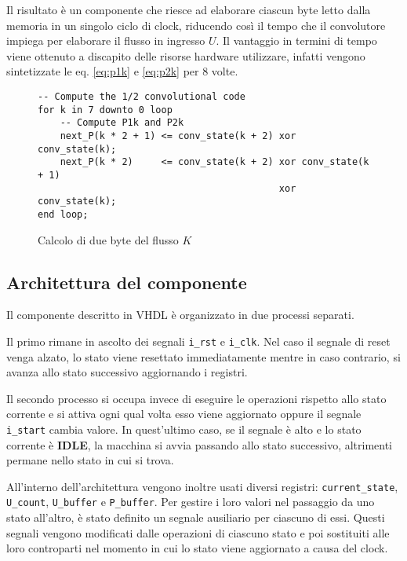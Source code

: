 Il risultato è un componente che riesce ad elaborare ciascun byte letto dalla memoria in un singolo ciclo di clock, riducendo così il tempo che il convolutore impiega per elaborare il flusso in ingresso $U$. Il vantaggio in termini di tempo viene ottenuto a discapito delle risorse hardware utilizzare, infatti vengono sintetizzate le eq. \ref{eq:p1k} e \ref{eq:p2k} per 8 volte.

\begin{figure}[!ht]
    \centering
    \begin{varwidth}{\linewidth}
        \begin{verbatim}
-- Compute the 1/2 convolutional code
for k in 7 downto 0 loop
    -- Compute P1k and P2k
    next_P(k * 2 + 1) <= conv_state(k + 2) xor conv_state(k);
    next_P(k * 2)     <= conv_state(k + 2) xor conv_state(k + 1)
                                           xor conv_state(k);
end loop;
    \end{verbatim}
    \end{varwidth}
    \caption{Calcolo di due byte del flusso $K$}
    \label{code:calcolop}
\end{figure}

\subsection{Architettura del componente}

Il componente descritto in VHDL è organizzato in due processi separati.

Il primo rimane in ascolto dei segnali \verb|i_rst| e \verb|i_clk|. Nel caso il segnale di reset venga alzato, lo stato viene resettato immediatamente mentre in caso contrario, si avanza allo stato successivo aggiornando i registri.

Il secondo processo si occupa invece di eseguire le operazioni rispetto allo stato corrente e si attiva ogni qual volta esso viene aggiornato oppure il segnale \verb|i_start| cambia valore. In quest'ultimo caso, se il segnale è alto e lo stato corrente è \textbf{IDLE}, la macchina si avvia passando allo stato successivo, altrimenti permane nello stato in cui si trova.

All'interno dell'architettura vengono inoltre usati diversi registri: \verb|current_state|, \verb|U_count|, \verb|U_buffer| e \verb|P_buffer|. Per gestire i loro valori nel passaggio da uno stato all'altro, è stato definito un segnale ausiliario per ciascuno di essi. Questi segnali vengono modificati dalle operazioni di ciascuno stato e poi sostituiti alle loro controparti nel momento in cui lo stato viene aggiornato a causa del clock.